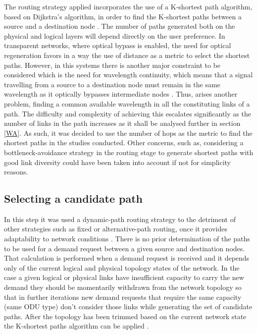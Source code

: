 The routing strategy applied incorporates the use of a K-shortest path algorithm, based on Dijkstra's algorithm, in order to find the K-shortest paths between a source and a destination node \cite{SimmonsJane2008}. The number of paths generated both on the physical and logical layers will depend directly on the user preference. In transparent networks, where optical bypass is enabled, the need for optical regeneration favors in a way the use of distance as a metric to select the shortest paths. However, in this systems there is another major constraint to be considered which is the need for wavelength continuity, which means that a signal travelling from a source to a destination node must remain in the same wavelength as it optically bypasses intermediate nodes \cite{SimmonsJane2008}. Thus, arises another problem, finding a common available wavelength in all the constituting links of a path. The difficulty and complexity of achieving this escalates significantly as the number of links in the path increases as it shall be analysed further in section \ref{WA}. As such, it was decided to use the number of hops as the metric to find the shortest paths in the studies conducted. Other concerns, such as, considering a bottleneck-avoidance strategy in the routing stage to generate shortest paths with good link diversity  could have been taken into account if not for simplicity reasons.  




\subsection{Selecting a candidate path}
\label{selecting}

In this step it was used a dynamic-path routing strategy to the detriment of other strategies such as fixed or alternative-path routing, once it provides adaptability to network conditions \cite{SimmonsJane2008}. There is no prior determination of the paths to be used for a demand request between a given source and destination nodes. That calculation is performed when a demand request is received and it depends only of the current logical and physical topology states of the network. In the case a given logical or physical links have insufficient capacity to carry the new demand they should be momentarily withdrawn from the network topology so that in further iterations new demand requests that require the same capacity (same ODU type) don't consider those links while generating the set of candidate paths. After the topology has been trimmed based on the current network state the K-shortest paths algorithm can be applied \cite{SimmonsJane2008}.

